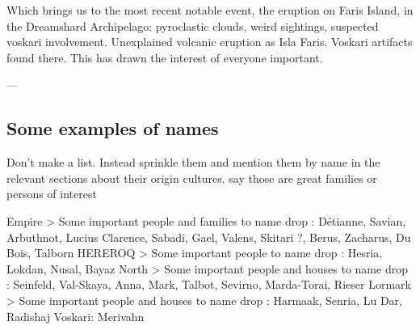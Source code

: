 Which brings us to the most recent notable event, the eruption on Faris Island, in the Dreamshard Archipelago: pyroclastic clouds, weird sightings, suspected voskari involvement. Unexplained volcanic eruption as Isla Faris. Voskari artifacts found there. This has drawn the interest of everyone important.








---




\subsection{Some examples of names}

Don't make a list. Instead sprinkle them and mention them by name in the relevant sections about their origin cultures. say those are great families or persons of interest



Empire > Some important people and families to name drop : Détianne, Savian, Arbuthnot, Lucius Clarence, Sabadi, Gael, Valens, Skitari ?, Berus, Zacharus, Du Bois, Talborn
HEREROQ > Some important people to name drop : Hesria, Lokdan, Nusal, Bayaz
North > Some important people and houses to name drop : Seinfeld, Val-Skaya, Anna, Mark, Talbot, Sevirno, Marda-Torai, Rieser
Lormark > Some important people and houses to name drop : Harmaak, Senria, Lu Dar, Radishaj
Voskari: Merivahn

